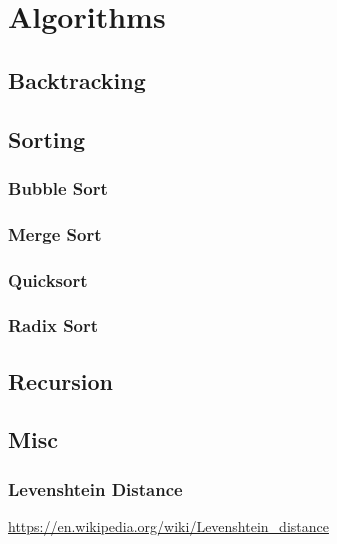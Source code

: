 \section{Algorithms}

\subsection{Backtracking}

\subsection{Sorting}

\subsubsection{Bubble Sort}
\subsubsection{Merge Sort}
\subsubsection{Quicksort}
\subsubsection{Radix Sort}

\subsection{Recursion}

\subsection{Misc}

\subsubsection{Levenshtein Distance}

\url{https://en.wikipedia.org/wiki/Levenshtein_distance}
